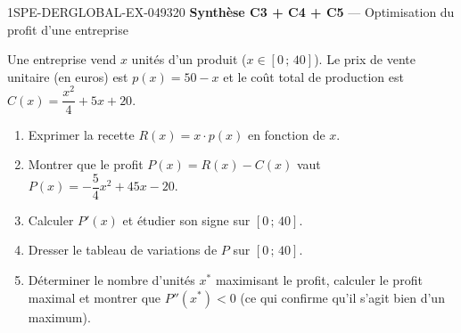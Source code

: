 \begin{exercice}{1SPE-DERGLOBAL-EX-049}{3}{20}
\textbf{Synthèse C3 + C4 + C5} — Optimisation du profit d'une entreprise

Une entreprise vend $x$ unités d'un produit ($x \in \left[0\,;\,40\right]$).
Le prix de vente unitaire (en euros) est $p(x) = 50 - x$ et le coût total de
production est $C(x) = \dfrac{x^2}{4} + 5x + 20$.

\begin{enumerate}
  \item Exprimer la recette $R(x) = x \cdot p(x)$ en fonction de $x$.
  \item Montrer que le profit $P(x) = R(x) - C(x)$ vaut
        $P(x) = -\dfrac{5}{4}x^2 + 45x - 20$.
  \item Calculer $P'(x)$ et étudier son signe sur $\left[0\,;\,40\right]$.
  \item Dresser le tableau de variations de $P$ sur $\left[0\,;\,40\right]$.
  \item Déterminer le nombre d'unités $x^*$ maximisant le profit, calculer le profit
        maximal et montrer que $P''(x^*) < 0$ (ce qui confirme qu'il s'agit bien d'un maximum).
\end{enumerate}
\end{exercice}
